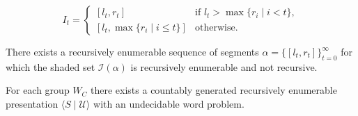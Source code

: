 \documentclass[10pt,a4paper]{amsart}
\begin{document}
\begin{equation}
\label{it-case}
I_t =
 \begin{cases}
   [l_t,r_t] &\text{if $l_t>\max \{r_i \mid i<t\}$},\\
   [l_t,\max \{r_i \mid i\leq t\}] &\text{otherwise}.
 \end{cases}
\end{equation}

\begin{prop}
\label{prop-shaded-set}
There exists a recursively enumerable sequence of segments $\alpha=\{[l_t,r_t]\}_{t=0}^\infty$ for which the shaded set $\mathcal I(\alpha)$ is recursively enumerable and not recursive.
\end{prop}

\begin{theorem}
For each group $W_C$ there exists a countably generated recursively enumerable presentation $\langle S \mid \mathcal U \rangle$ with an undecidable word problem.
\label{th-undecidable}
\end{theorem}
\end{document}
